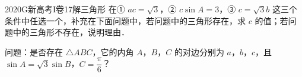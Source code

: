 
\begin{problem}{2020}{G}{新高考I卷}{17}{解三角形}
在① $ ac=\sqrt{3} $，② $ c\sin A=3 $，③ $ c=\sqrt{3}b $ 这三个条件中任选一个，补充在下面问题中，若问题中的三角形存在，求 $ c $ 的值；若问题中的三角形不存在，说明理由．

问题：是否存在 $ \triangle ABC $，它的内角 $ A $，$ B $，$ C $ 的对边分别为 $ a $，$ b $，$ c $，且 $ \sin A=\sqrt{3}\sin B $，$ C=\dfrac{\pi}{6} $？
\end{problem}

\begin{answer}

\end{answer}

\begin{solutions}

\end{solutions}